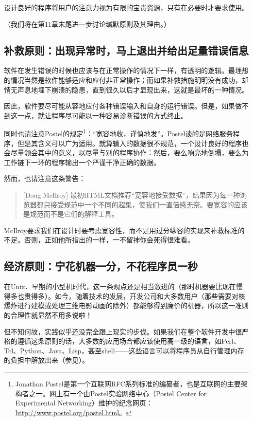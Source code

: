 \documentclass[12pt,oneside]{book}
\begin{document}
设计良好的程序将用户的注意力视为有限的宝贵资源，只有在必要时才要求使用。

（我们将在第11章末尾进一步讨论缄默原则及其理由。）


\subsection{补救原则：出现异常时，马上退出并给出足量错误信息}
软件在发生错误的时候也应该与在正常操作的情况下一样，有透明的逻辑。最理想的情况当然是软件能够适应和应付非正常操作；而如果补救措施明明没有成功，却悄无声息地埋下崩溃的隐患，直到很久以后才显现出来，这就是最坏的一种情况。

因此，软件要尽可能从容地应付各种错误输入和自身的运行错误。但是，如果做不到这一点，就让程序尽可能以一种容易诊断错误的方式终止。

同时也请注意Postel的规定\footnote{Jonathan Postel是第一个互联网RFC系列标准的编纂者，也是互联网的主要架构者之一。网上有一个由Postel实验网络中心（Postel Center for Experimental Networking）维护的纪念网页：\href{http://www.postel.org/postel.html}{http://www.postel.org/postel.html}。}：“宽容地收，谨慎地发”。Postel谈的是网络服务程序，但是其含义可以广为适用。就算输入的数据很不规范，一个设计良好的程序也会尽量领会其中的意义，以尽量与别的程序协作：然后，要么响亮地倒塌，要么为工作链下一环的程序输出一个严谨干净正确的数据。

然而，也请注意这条警告：

\begin{quote}[Doug McIlroy]
最初HTML文档推荐“宽容地接受数据”，结果因为每一种浏览器都只接受规范中一个不同的超集，使我们一直倍感无奈。要宽容的应该是规范而不是它们的解释工具。
\end{quote}

McIlroy要求我们在设计时要考虑宽容性，而不是用过分纵容的实现来补救标准的不足。否则，正如他所指出的一样，一不留神你会死得很难看。

\subsection{经济原则：宁花机器一分，不花程序员一秒}
在Unix．早期的小型机时代，这一条观点还是相当激进的（那时机器要比现在慢得多也贵得多）。如今，随着技术的发展，开发公司和大多数用户（那些需要对核爆炸进行建模或处理三维电影动画的除外）都能够得到廉价的机器，所以这一准则的合理性就显然不用多说啦！

但不知何故，实践似乎还没完全跟上现实的步伐。如果我们在整个软件开发中很严格的遵循这条原则的话，大多数的应用场合都应该使用高一级的语言，如Perl、Tcl、Python、Java、Lisp，甚至shell——这些语言可以将程序员从自行管理内存的负担中解放出来（参见\cite{Ravenbrook}）。
\end{document}
